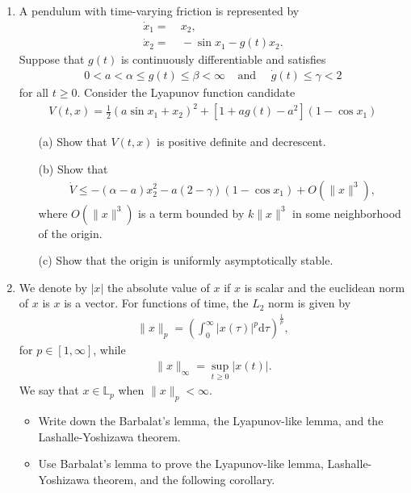\documentclass[a4paper,11pt]{article}
\begin{document}
\begin{enumerate}
  \item A pendulum with time-varying friction is represented by
 \begin{align}
 \dot x_1=&~x_2,\\
 \dot x_2=&~-\sin x_1-g(t)x_2.
 \end{align}
 Suppose that $g(t)$ is continuously differentiable and satisfies
 \begin{align*}
 0<a<\alpha\leq g(t)\leq \beta<\infty ~~~~~\mbox{and}~~~~~~\dot g(t)\leq \gamma<2
 \end{align*}
 for all $t\geq 0$. Consider the Lyapunov function candidate
 \begin{align}
 V(t,x)=\frac{1}{2}(a\sin x_1+x_2)^2+[1+ag(t)-a^2](1-\cos x_1)
 \end{align}
  \begin{itemize}
 \item[(a)] Show that $V(t,x)$ is positive definite and decrescent.

   \item[(b)]
   Show that
   \begin{align}
   \dot V\leq-(\alpha-a)x_2^2-a(2-\gamma)(1-\cos x_1)+O(\|x\|^3),
   \end{align}
where $O(\|x\|^3)$ is a term bounded by $k\|x\|^3$ in some neighborhood of the origin.

   \item[(c)] Show that the origin is uniformly asymptotically stable.
 \end{itemize}


  \item We denote by $|x|$ the absolute value of $x$ if $x$ is scalar and the euclidean norm of $x$ is $x$ is a
  vector. For functions of time, the $L_2$ norm is given by
  \begin{align}
  \|x\|_p=\left(\int_0^{\infty}|x(\tau)|^p\mbox{d}\tau\right)^{\frac{1}{p}},
  \end{align}
 for $p\in[1,\infty]$, while
  \begin{align}
  \|x\|_{\infty}=\sup_{t\geq 0} |x(t)|.
  \end{align}
 We say that $x\in\mathbb{L}_p$ when $\|x\|_p<\infty$.


\begin{itemize}
  \item Write down the Barbalat's lemma, the Lyapunov-like lemma, and the Lashalle-Yoshizawa theorem.
  \item Use Barbalat's lemma to prove the Lyapunov-like lemma, Lashalle-Yoshizawa theorem, and the following corollary.


\end{itemize}
\end{enumerate}
\end{document}
